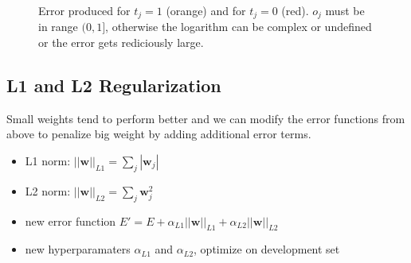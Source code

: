 \begin{figure}
\centering
{}
\caption{Error produced for $t_j=1$ (orange) and for $t_j=0$ (red). $o_j$ must be in range $(0,1]$, otherwise the logarithm can be complex or undefined or the error gets rediciously large.}
\end{figure}

\subsection{L1 and L2 Regularization}
Small weights tend to perform better and we can modify the error functions from above to penalize big weight by adding additional error terms.
\begin{itemize}
\item L1 norm: $||\mathbf{w}||_{L1} = \sum_j |\mathbf{w}_j|$
\item L2 norm: $||\mathbf{w}||_{L2} = \sum_j \mathbf{w}_j^2$
\item new error function $E' = E + \alpha_{L1} ||\mathbf{w}||_{L1} + \alpha_{L2} ||\mathbf{w}||_{L2}$
\item new hyperparamaters $\alpha_{L1}$ and $\alpha_{L2}$, optimize on development set
\end{itemize}

